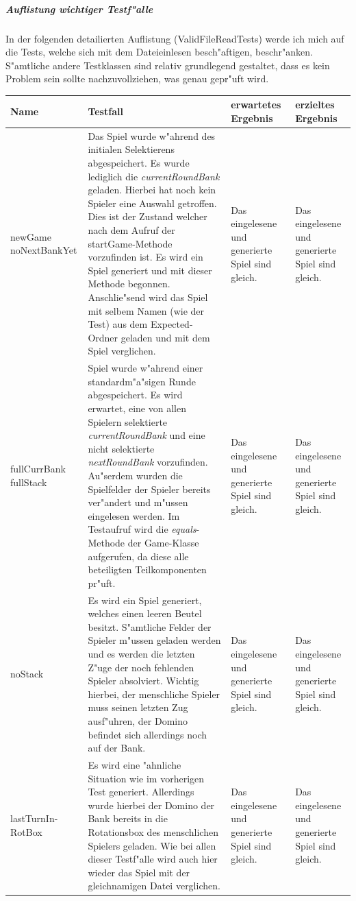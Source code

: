 \subparagraph{Auflistung wichtiger Testf"alle}
In der folgenden detailierten Auflistung (ValidFileReadTests) werde ich mich auf die Tests, welche sich mit dem Dateieinlesen besch"aftigen, beschr"anken. S"amtliche andere Testklassen sind relativ grundlegend gestaltet, dass es kein Problem sein sollte nachzuvollziehen, was genau gepr"uft wird. 

\bigbreak

\begin{tabular}{|p{2cm}|p{7cm}|p{2cm}|p{2cm}|}
	\hline
	Name & Testfall & erwartetes Ergebnis & erzieltes Ergebnis \\
	\hline
	\hline
	newGame noNextBankYet & Das Spiel wurde w"ahrend des initialen Selektierens abgespeichert. Es wurde lediglich die \emph{currentRoundBank} geladen. Hierbei hat noch kein Spieler eine Auswahl getroffen. Dies ist der Zustand welcher nach dem Aufruf der startGame-Methode vorzufinden ist. Es wird ein Spiel generiert und mit dieser Methode begonnen. Anschlie"send wird das Spiel mit selbem Namen (wie der Test) aus dem Expected-Ordner geladen und mit dem Spiel verglichen. & Das eingelesene und generierte Spiel sind gleich. & Das eingelesene und generierte Spiel sind gleich. \\
		
	fullCurrBank fullStack & Spiel wurde w"ahrend einer standardm"a"sigen Runde abgespeichert. Es wird erwartet, eine von allen Spielern selektierte \emph{currentRoundBank} und eine nicht selektierte \emph{nextRoundBank} vorzufinden. Au"serdem wurden die Spielfelder der Spieler bereits ver"andert und m"ussen eingelesen werden. Im Testaufruf wird die \emph{equals}-Methode der Game-Klasse aufgerufen, da diese alle beteiligten Teilkomponenten pr"uft. & Das eingelesene und generierte Spiel sind gleich. & Das eingelesene und generierte Spiel sind gleich. \\
	
	noStack & Es wird ein Spiel generiert, welches einen leeren Beutel besitzt. S"amtliche Felder der Spieler m"ussen geladen werden und es werden die letzten Z"uge der noch fehlenden Spieler absolviert. Wichtig hierbei, der menschliche Spieler muss seinen letzten Zug ausf"uhren, der Domino befindet sich allerdings noch auf der Bank. & Das eingelesene und generierte Spiel sind gleich. & Das eingelesene und generierte Spiel sind gleich. \\
	
	lastTurnIn- \newline RotBox & Es wird eine "ahnliche Situation wie im vorherigen Test generiert. Allerdings wurde hierbei der Domino der Bank bereits in die Rotationsbox des menschlichen Spielers geladen. Wie bei allen dieser Testf"alle wird auch hier wieder das Spiel mit der gleichnamigen Datei verglichen. & Das eingelesene und generierte Spiel sind gleich. & Das eingelesene und generierte Spiel sind gleich. \\	
	\hline
\end{tabular}

